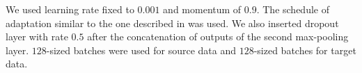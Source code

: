 We used learning rate fixed to $0.001$ and momentum of $0.9$. The schedule of adaptation similar to the one described in  was used. We also inserted dropout layer with rate $0.5$ after the concatenation of outputs of the second max-pooling layer. $128$-sized batches were used for source data and $128$-sized batches for target data. 


